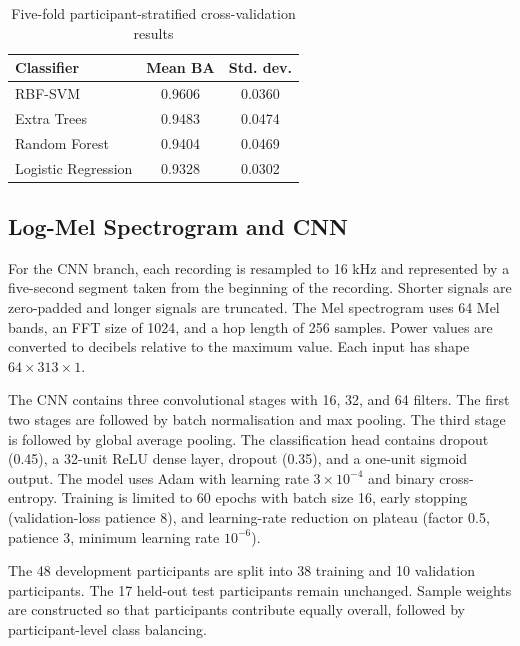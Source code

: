 \documentclass[11pt,a4paper]{article}
\begin{document}
\begin{table}[!t]
\centering
\caption{Five-fold participant-stratified cross-validation results}
\label{tab:cv}
\begin{tabular}{lcc}
\toprule
Classifier & Mean BA & Std. dev.\\
\midrule
RBF-SVM & 0.9606 & 0.0360\\
Extra Trees & 0.9483 & 0.0474\\
Random Forest & 0.9404 & 0.0469\\
Logistic Regression & 0.9328 & 0.0302\\
\bottomrule
\end{tabular}
\end{table}

\subsection{Log-Mel Spectrogram and CNN}
For the CNN branch, each recording is resampled to 16 kHz and represented by a five-second segment taken from the beginning of the recording. Shorter signals are zero-padded and longer signals are truncated. The Mel spectrogram uses 64 Mel bands, an FFT size of 1024, and a hop length of 256 samples. Power values are converted to decibels relative to the maximum value. Each input has shape $64\times313\times1$.

The CNN contains three convolutional stages with 16, 32, and 64 filters. The first two stages are followed by batch normalisation and max pooling. The third stage is followed by global average pooling. The classification head contains dropout (0.45), a 32-unit ReLU dense layer, dropout (0.35), and a one-unit sigmoid output. The model uses Adam with learning rate $3\times10^{-4}$ and binary cross-entropy. Training is limited to 60 epochs with batch size 16, early stopping (validation-loss patience 8), and learning-rate reduction on plateau (factor 0.5, patience 3, minimum learning rate $10^{-6}$).

The 48 development participants are split into 38 training and 10 validation participants. The 17 held-out test participants remain unchanged. Sample weights are constructed so that participants contribute equally overall, followed by participant-level class balancing.
\end{document}
